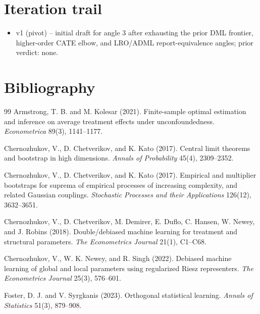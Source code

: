 \documentclass[11pt]{article}
\theoremstyle{definition}
\theoremstyle{plain}
\theoremstyle{remark}
\begin{document}
\section{Iteration trail}
\begin{itemize}
\item v1 (pivot) -- initial draft for angle 3 after exhausting the prior DML
frontier, higher-order CATE elbow, and LRO/ADML report-equivalence angles;
prior verdict: none.
\end{itemize}

\section*{Bibliography}
\begin{thebibliography}{99}
Armstrong, T. B. and M. Kolesar (2021).
\newblock Finite-sample optimal estimation and inference on average treatment effects under unconfoundedness.
\newblock \emph{Econometrica} 89(3), 1141--1177.

Chernozhukov, V., D. Chetverikov, and K. Kato (2017).
\newblock Central limit theorems and bootstrap in high dimensions.
\newblock \emph{Annals of Probability} 45(4), 2309--2352.

Chernozhukov, V., D. Chetverikov, and K. Kato (2017).
\newblock Empirical and multiplier bootstraps for suprema of empirical processes of increasing complexity, and related Gaussian couplings.
\newblock \emph{Stochastic Processes and their Applications} 126(12), 3632--3651.

Chernozhukov, V., D. Chetverikov, M. Demirer, E. Duflo, C. Hansen, W. Newey, and J. Robins (2018).
\newblock Double/debiased machine learning for treatment and structural parameters.
\newblock \emph{The Econometrics Journal} 21(1), C1--C68.

Chernozhukov, V., W. K. Newey, and R. Singh (2022).
\newblock Debiased machine learning of global and local parameters using regularized Riesz representers.
\newblock \emph{The Econometrics Journal} 25(3), 576--601.

Foster, D. J. and V. Syrgkanis (2023).
\newblock Orthogonal statistical learning.
\newblock \emph{Annals of Statistics} 51(3), 879--908.


\end{thebibliography}
\end{document}

